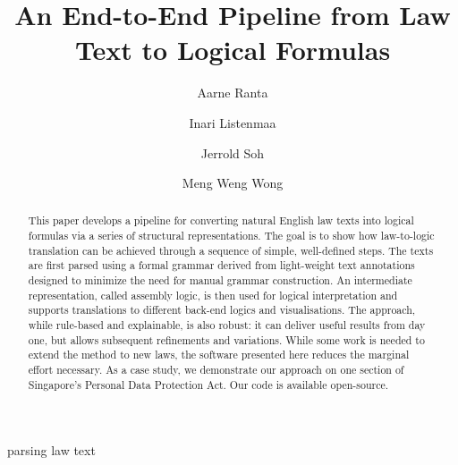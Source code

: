 \documentclass{IOS-Book-Article}
\def\hb{\hbox to 11.5 cm{}}
\begin{document}
\pagestyle{headings}
\def\thepage{}
\begin{frontmatter}              %

\title{An End-to-End Pipeline from Law Text to Logical Formulas}

\markboth{}{August 2022\hb}

\author[A]{Aarne Ranta}
\author[C]{Inari Listenmaa}
\author[C]{Jerrold Soh}
\author[C]{Meng Weng Wong}

\address[A]{
  Department of Computer Science and Engineering,
  Chalmers University of Technology and University of Gothenburg,
  aarne.ranta@cse.gu.se
  }
\address[B]{SMU and Digital Grammars}
\address[C]{Yong Pung How School of Law, Singapore Management University}

\begin{abstract}
 This paper develops a pipeline for converting natural English law texts into logical formulas via a series of structural representations. The goal is to show how law-to-logic translation can be achieved through a sequence of simple, well-defined steps. The texts are first parsed using a formal grammar derived from light-weight text annotations designed to minimize the need for manual grammar construction. An intermediate representation, called assembly logic, is then used for logical interpretation and supports translations to different back-end logics and visualisations. The approach, while rule-based and explainable, is also robust: it can deliver useful results from day one, but allows subsequent refinements and variations. While some work is needed to extend the method to new laws, the software presented here reduces the marginal effort necessary. As a case study, we demonstrate our approach on one section of Singapore’s Personal Data Protection Act. Our code is available open-source.
\end{abstract}


\begin{keyword}
parsing law text
\end{keyword}
\end{frontmatter}
\markboth{August 2022\hb}{August 2022\hb}

\end{document}
